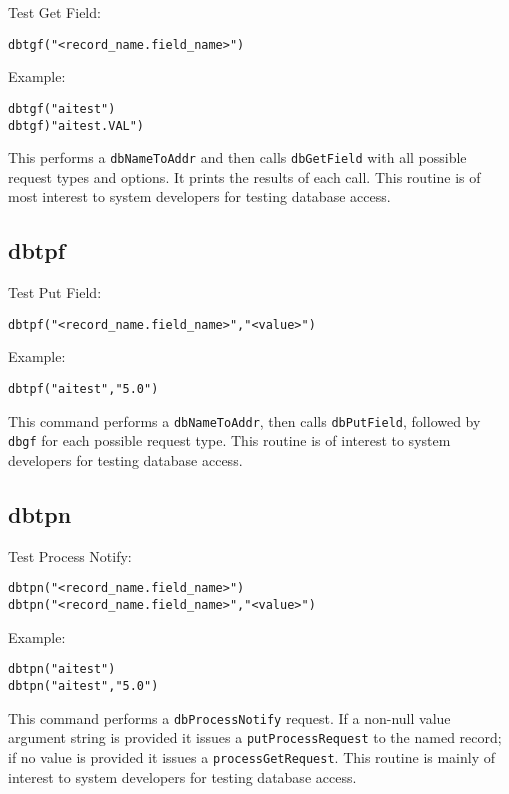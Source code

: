 Test Get Field:

\begin{verbatim}
dbtgf("<record_name.field_name>")
\end{verbatim}

Example:

\begin{verbatim}
dbtgf("aitest")
dbtgf)"aitest.VAL")
\end{verbatim}

This performs a \verb|dbNameToAddr| and then calls \verb|dbGetField| with all possible request types and options. It prints the 
results of each call. This routine is of most interest to system developers for testing database access.

\subsection{dbtpf}

Test Put Field:

\begin{verbatim}
dbtpf("<record_name.field_name>","<value>")
\end{verbatim}

Example:

\begin{verbatim}
dbtpf("aitest","5.0")
\end{verbatim}

This command performs a \verb|dbNameToAddr|, then calls \verb|dbPutField|, followed by \verb|dbgf| for each possible request type. 
This routine is of interest to system developers for testing database access.

\subsection{dbtpn}

Test Process Notify:

\begin{verbatim}
dbtpn("<record_name.field_name>")
dbtpn("<record_name.field_name>","<value>")
\end{verbatim}

Example:

\begin{verbatim}
dbtpn("aitest")
dbtpn("aitest","5.0")
\end{verbatim}

This command performs a \verb|dbProcessNotify| request.
If a non-null value argument string is provided it issues a \verb|putProcessRequest| to the named record;
if no value is provided it issues a \verb|processGetRequest|.
This routine is mainly of interest to system developers for testing database access.


